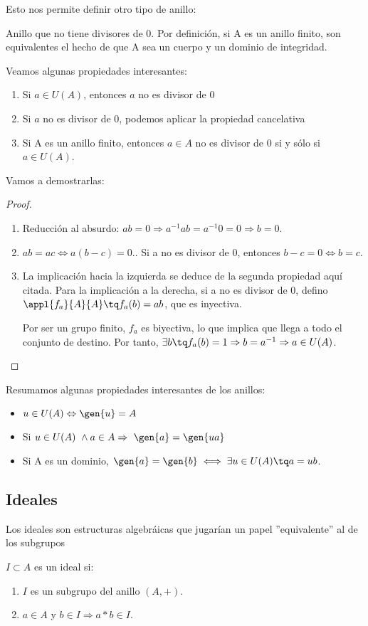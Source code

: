 \documentclass[nochap]{apuntes}
\begin{document}
Esto nos permite definir otro tipo de anillo:
\begin{defn}
 Anillo que no tiene divisores de 0. Por definición, si A es un anillo finito, son equivalentes el hecho de que A sea un cuerpo y un dominio de integridad.
\end{defn}

Veamos algunas propiedades interesantes:
\begin{enumerate}
 \item Si $a \in U(A)$, entonces $a$ no es divisor de 0
 \item Si $a$ no es divisor de 0, podemos aplicar la propiedad cancelativa
 \item Si A es un anillo finito, entonces  $a \in A$ no es divisor de 0 si y sólo si  $a \in U(A)$.
\end{enumerate}

Vamos a demostrarlas:
\begin{proof}
 \begin{enumerate}
  \item Reducción al absurdo: $ab=0 \Rightarrow a^{-1}ab=a^{-1}0=0 \Rightarrow b=0$.
  \item $ab=ac \Leftrightarrow a(b-c)=0$.. Si a no es divisor de 0, entonces $b-c=0 \Leftrightarrow b=c$.
  \item La implicación hacia la izquierda se deduce de la segunda propiedad aquí citada.
  Para la implicación a la derecha, si a no es divisor de 0, defino $\appl{f_a}{A}{A} \tq f_a(b)=ab$, que es inyectiva.
  
  Por ser un grupo finito, $f_a$ es biyectiva, lo que implica que llega a todo el conjunto de destino. Por tanto, $\exists b \tq f_a(b)=1 \Rightarrow b=a^{-1}  \Rightarrow a \in U(A)$.
 \end{enumerate}

\end{proof}

Resumamos algunas propiedades interesantes de los anillos:
\begin{itemize}
 \item $u\in U(A) \Leftrightarrow \gen{u} = A$
 \item Si $u \in U(A) \ \wedge a \in A \Rightarrow \ \gen{a}=\gen{ua}$
 \item Si A es un dominio, $\gen{a}=\gen{b} \iff \exists u \in U(A) \tq a=ub$.
\end{itemize}

\subsection{Ideales}\label{defIdeal}
Los ideales son estructuras algebráicas que jugarían un papel ''equivalente'' al de los subgrupos
\begin{defn}[Ideal]
 $I\subset A$ es un ideal si:
 \begin{enumerate}
  \item $I$ es un subgrupo del anillo $(A, +)$.
  \item $a \in A$ y $b \in I \Rightarrow a*b \in I$.
 \end{enumerate}
\end{defn}
\end{document}
